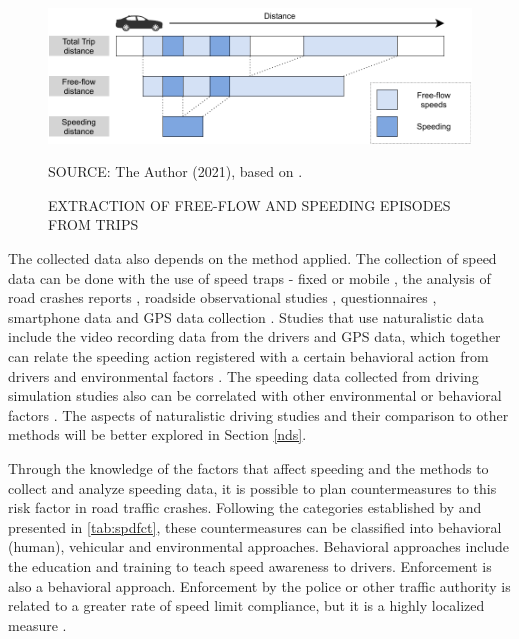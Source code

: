 \begin{figure}[!htbp]
    \centering\footnotesize
    \captionsetup{font=footnotesize}
    \caption{EXTRACTION OF FREE-FLOW AND SPEEDING EPISODES FROM TRIPS}
    \includegraphics{fig/richards.pdf}
    \label{fig:ff}
    \par SOURCE: The Author (2021), based on \textcite{Richard2013}.
\end{figure}

The collected data also depends on the method applied. The collection of speed data can be done with the use of speed traps - fixed or mobile \cite{Hidalgo-Solorzano2020, WHO2008}, the analysis of road crashes reports \cite{Watson2015}, roadside observational studies \cite{Shinar2017}, questionnaires \cite{Dinh2013}, smartphone data \cite{Warren2019} and GPS data collection \cite{Moreno2013, Wang2018}. Studies that use naturalistic data include the video recording data from the drivers and GPS data, which together can relate the speeding action registered with a certain behavioral action from drivers \cite{Bastos2020a} and environmental factors \cite{Moreno2013}. The speeding data collected from driving simulation studies also can be correlated with other environmental or behavioral factors \cite{Yadav2020}. The aspects of naturalistic driving studies and their comparison to other methods will be better explored in Section \ref{nds}. 

Through the knowledge of the factors that affect speeding and the methods to collect and analyze speeding data, it is possible to plan countermeasures to this risk factor in road traffic crashes. Following the categories established by \textcite{Haddon1980} and presented in \autoref{tab:spdfct}, these countermeasures can be classified into behavioral (human), vehicular and environmental approaches. Behavioral approaches include the education and training to teach speed awareness to drivers. Enforcement is also a behavioral approach. Enforcement by the police or other traffic authority is related to a greater rate of speed limit compliance, but it is a highly localized measure \cite{Shinar2017}. 

